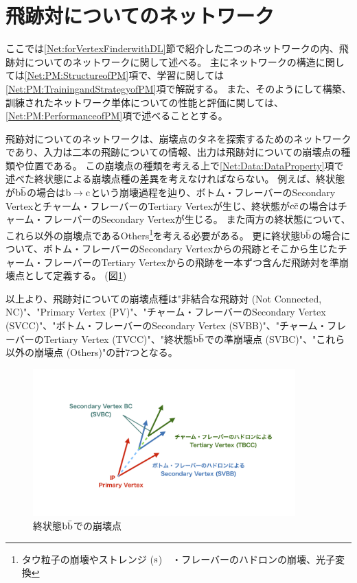 \section{飛跡対についてのネットワーク} \label{Net:PairModel}

ここでは\ref{Net:forVertexFinderwithDL}節で紹介した二つのネットワークの内、飛跡対についてのネットワークに関して述べる。
主にネットワークの構造に関しては\ref{Net:PM:StructureofPM}項で、学習に関しては\ref{Net:PM:TrainingandStrategyofPM}項で解説する。
また、そのようにして構築、訓練されたネットワーク単体についての性能と評価に関しては、\ref{Net:PM:PerformanceofPM}項で述べることとする。

飛跡対についてのネットワークは、崩壊点のタネを探索するためのネットワークであり、入力は二本の飛跡についての情報、出力は飛跡対についての崩壊点の種類や位置である。
この崩壊点の種類を考える上で\ref{Net:Data:DataProperty}項で述べた終状態による崩壊点種の差異を考えなければならない。
例えば、終状態が$\rm b\bar{b}$の場合は$\rm b \to c$という崩壊過程を辿り、ボトム・フレーバーのSecondary Vertexとチャーム・フレーバーのTertiary Vertexが生じ、終状態が$\rm c\bar{c}$の場合はチャーム・フレーバーのSecondary Vertexが生じる。
また両方の終状態について、これら以外の崩壊点であるOthers\footnote{タウ粒子の崩壊やストレンジ ($\rm s$)　・フレーバーのハドロンの崩壊、光子変換}を考える必要がある。
更に終状態$\rm b\bar{b}$の場合について、ボトム・フレーバーのSecondary Vertexからの飛跡とそこから生じたチャーム・フレーバーのTertiary Vertexからの飛跡を一本ずつ含んだ飛跡対を準崩壊点として定義する。 (図\ref{3-3-0-1SecondaryVertexBC}) 

以上より、飛跡対についての崩壊点種は"非結合な飛跡対 (Not Connected, NC)"、"Primary Vertex (PV)"、"チャーム・フレーバーのSecondary Vertex (SVCC)"、"ボトム・フレーバーのSecondary Vertex (SVBB)"、"チャーム・フレーバーのTertiary Vertex (TVCC)"、"終状態$\rm b\bar{b}$での準崩壊点 (SVBC)"、"これら以外の崩壊点 (Others)"の計$7$つとなる。

\begin{figure}[htbp]
 \centering
 \includegraphics[trim = 200 150 200 150, width=0.9\textwidth, clip]{Figure/3Networks/3-3-0-1SecondaryVertexBC.png}
 \caption{終状態$\rm b\bar{b}$での崩壊点}
 \label{3-3-0-1SecondaryVertexBC}
\end{figure}

